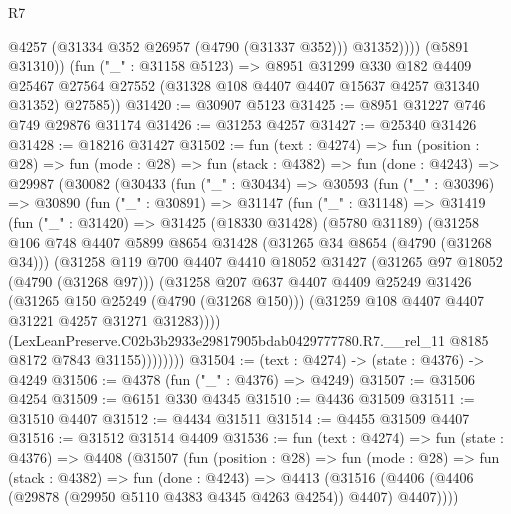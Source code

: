 \begin{lexlean}{R7}
\begin{coremodule}
                @4257
                (@31334 @352 @26957 (@4790 (@31337 @352)))
                @31352))))
        (@5891 @31310))
      (fun ("_" : @31158 @5123) =>
      @8951
        @31299
        @330
        @182
        @4409
        @25467
        @27564
        @27552
        (@31328 @108 @4407 @4407 @15637 @4257 @31340 @31352)
        @27585))
@31420 := @30907 @5123
@31425 := @8951 @31227 @746 @749 @29876 @31174
@31426 := @31253 @4257
@31427 := @25340 @31426
@31428 := @18216 @31427
@31502 := fun (text : @4274) =>
  fun (position : @28) =>
  fun (mode : @28) =>
  fun (stack : @4382) =>
  fun (done : @4243) =>
  @29987
    (@30082
      (@30433
        (fun ("_" : @30434) =>
        @30593
          (fun ("_" : @30396) =>
          @30890
            (fun ("_" : @30891) =>
            @31147
              (fun ("_" : @31148) =>
              @31419
                (fun ("_" : @31420) =>
                @31425
                  (@18330 @31428)
                  (@5780 @31189)
                  (@31258
                    @106
                    @748
                    @4407
                    @5899
                    @8654
                    @31428
                    (@31265 @34 @8654 (@4790 (@31268 @34)))
                    (@31258
                      @119
                      @700
                      @4407
                      @4410
                      @18052
                      @31427
                      (@31265 @97 @18052 (@4790 (@31268 @97)))
                      (@31258
                        @207
                        @637
                        @4407
                        @4409
                        @25249
                        @31426
                        (@31265 @150 @25249 (@4790 (@31268 @150)))
                        (@31259 @108 @4407 @4407 @31221 @4257 @31271 @31283))))
                  (LexLeanPreserve.C02b3b2933e29817905bdab0429777780.R7.__rel_11
                    @8185
                    @8172
                    @7843
                    @31155))))))))
@31504 := (text : @4274) -> (state : @4376) -> @4249
@31506 := @4378 (fun ("_" : @4376) => @4249)
@31507 := @31506 @4254
@31509 := @6151 @330 @4345
@31510 := @4436 @31509
@31511 := @31510 @4407
@31512 := @4434 @31511
@31514 := @4455 @31509 @4407
@31516 := @31512 @31514 @4409
@31536 := fun (text : @4274) =>
  fun (state : @4376) =>
  @4408
    (@31507
      (fun (position : @28) =>
      fun (mode : @28) =>
      fun (stack : @4382) =>
      fun (done : @4243) =>
      @4413 (@31516 (@4406 (@4406 (@29878 (@29950 @5110 @4383 @4345 @4263 @4254)) @4407) @4407))))

\end{coremodule}
\end{lexlean}
